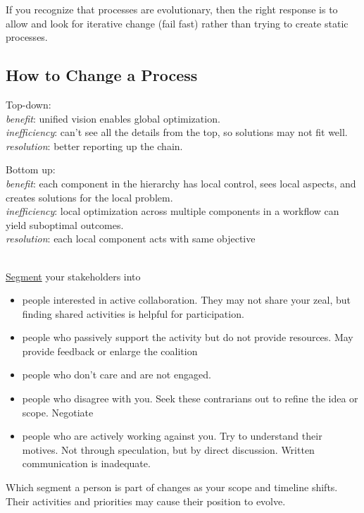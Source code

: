 If you recognize that processes are evolutionary, then the right response is to allow and look for iterative change (fail fast) rather than trying to create static processes.

\subsection*{How to Change a Process}
Top-down:\\
\textit{benefit}: unified vision enables global optimization.\\
\textit{inefficiency}: can't see all the details from the top, so solutions may not fit well.\\
\textit{resolution}: better reporting up the chain.

Bottom up:\\
\textit{benefit}: each component in the hierarchy has local control, sees local aspects, and creates solutions for the local problem.\\
\textit{inefficiency}: local optimization across multiple components in a workflow can yield suboptimal outcomes.\\
\textit{resolution}: each local component acts with same objective

\ \\

\href{https://en.wikipedia.org/wiki/Market_segmentation}{Segment} your stakeholders into 

\begin{itemize}
 \item people interested in active collaboration. They may not share your zeal, but finding shared activities is helpful for participation.
    \item people who passively support the activity but do not provide resources. May provide feedback or enlarge the coalition
    \item people who don't care and are not engaged.
    \item people who disagree with you. Seek these contrarians out to refine the idea or scope. Negotiate
    \item people who are actively working against you. Try to understand their motives. Not through speculation, but by direct discussion. Written communication is inadequate. 
\end{itemize}

Which segment a person is part of changes as your scope and timeline shifts. Their activities and priorities may cause their position to evolve. 

